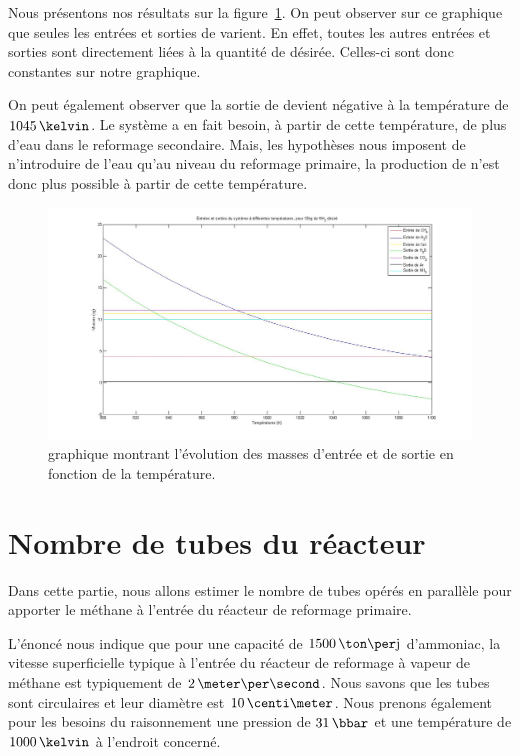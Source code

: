 \documentclass[a4paper,12pt]{article}
\begin{document}
Nous présentons nos résultats sur la figure~\ref{fig:graphe}. On peut observer sur ce graphique que seules les entrées et sorties de
 varient.
En effet, toutes les autres entrées et sorties sont directement
liées à la quantité de  désirée.
Celles-ci sont donc constantes sur notre graphique.

On peut également observer que la sortie de  devient négative
à la température de $1045\,\kelvin$.
Le système a en fait besoin, à partir de cette température,
de plus d'eau dans le reformage secondaire. Mais, les hypothèses nous imposent de n'introduire de l'eau qu'au niveau du reformage primaire, la production de  n'est donc plus possible à partir de cette température.

\begin{figure}
\begin{center}
\includegraphics[width=\textwidth]{graphe1}
\caption{graphique montrant l'évolution des masses d'entrée et de sortie en fonction de la température.}
\label{fig:graphe}
\end{center}
\end{figure}

\section{Nombre de tubes du réacteur}

Dans cette partie, nous allons estimer le nombre de tubes opérés
en parallèle pour apporter le méthane à l'entrée du réacteur de reformage primaire.

L’énoncé nous indique que pour une capacité de $1500\,\ton\per\jour$ d’ammoniac,
la vitesse superficielle typique à l’entrée du réacteur de reformage
à vapeur de méthane est typiquement de $2\,\meter\per\second$.
Nous savons que les tubes sont circulaires et leur diamètre est $10\,\centi\meter$.
Nous prenons également pour les besoins du raisonnement
une pression de $31\,\bbar$ et une température de $1000\,\kelvin$
à l'endroit concerné.
\end{document}
